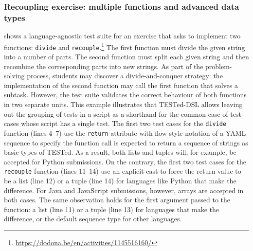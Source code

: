 \documentclass[../main]{subfiles}
\begin{document}
\subsubsection{Recoupling exercise: multiple functions and advanced data types}\label{subsubsec:recoupling-exercise:-multiple-functions-and-advanced-data-types}

 shows a language-agnostic test suite for an exercise that asks to implement two functions: \texttt{divide} and \texttt{recouple}.\footnote{\url{https://dodona.be/en/activities/1145516160/}}
The first function must divide the given string into a number of parts.
The second function must split each given string and then recombine the corresponding parts into new strings.
As part of the problem-solving process, students may discover a divide-and-conquer strategy: the implementation of the second function may call the first function that solves a subtask.
However, the test suite validates the correct behaviour of both functions in two separate units.
This example illustrates that TESTed-DSL allows leaving out the grouping of tests in a script as a shorthand for the common case of test cases whose script has a single test.
The first two test cases for the \texttt{divide} function (lines 4--7) use the \texttt{return} attribute with flow style notation of a YAML sequence to specify the function call is expected to return a sequence of strings as basic types of TESTed.
As a result, both lists and tuples will, for example, be accepted for Python submissions.
On the contrary, the first two test cases for the \texttt{recouple} function (lines 11--14) use an explicit cast to force the return value to be a list (line 12) or a tuple (line 14) for languages like Python that make the difference.
For Java and JavaScript submissions, however, arrays are accepted in both cases.
The same observation holds for the first argument passed to the function: a list (line 11) or a tuple (line 13) for languages that make the difference, or the default sequence type for other languages.
\end{document}
